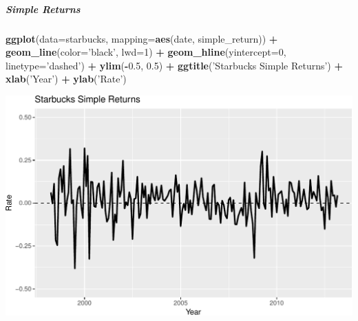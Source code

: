 \documentclass[]{article}
\newenvironment{Shaded}{\begin{snugshade}}{\end{snugshade}}
\newcommand{\KeywordTok}[1]{\textcolor[rgb]{0.13,0.29,0.53}{\textbf{#1}}}
\newcommand{\DataTypeTok}[1]{\textcolor[rgb]{0.13,0.29,0.53}{#1}}
\newcommand{\DecValTok}[1]{\textcolor[rgb]{0.00,0.00,0.81}{#1}}
\newcommand{\FloatTok}[1]{\textcolor[rgb]{0.00,0.00,0.81}{#1}}
\newcommand{\StringTok}[1]{\textcolor[rgb]{0.31,0.60,0.02}{#1}}
\newcommand{\OperatorTok}[1]{\textcolor[rgb]{0.81,0.36,0.00}{\textbf{#1}}}
\newcommand{\NormalTok}[1]{#1}
\let\oldsubparagraph\subparagraph
\renewcommand{\subparagraph}[1]{\oldsubparagraph{#1}\mbox{}}
\begin{document}
\begin{Shaded}
\end{Shaded}

\subparagraph{Simple Returns}\label{simple-returns}

\begin{Shaded}
\begin{Highlighting}[]
\KeywordTok{ggplot}\NormalTok{(}\DataTypeTok{data=}\NormalTok{starbucks, }\DataTypeTok{mapping=}\KeywordTok{aes}\NormalTok{(date, simple_return)) }\OperatorTok{+}
\StringTok{  }\KeywordTok{geom_line}\NormalTok{(}\DataTypeTok{color=}\StringTok{'black'}\NormalTok{, }\DataTypeTok{lwd=}\DecValTok{1}\NormalTok{) }\OperatorTok{+}
\StringTok{  }\KeywordTok{geom_hline}\NormalTok{(}\DataTypeTok{yintercept=}\DecValTok{0}\NormalTok{, }\DataTypeTok{linetype=}\StringTok{'dashed'}\NormalTok{) }\OperatorTok{+}
\StringTok{  }\KeywordTok{ylim}\NormalTok{(}\OperatorTok{-}\FloatTok{0.5}\NormalTok{, }\FloatTok{0.5}\NormalTok{) }\OperatorTok{+}
\StringTok{  }\KeywordTok{ggtitle}\NormalTok{(}\StringTok{'Starbucks Simple Returns'}\NormalTok{) }\OperatorTok{+}
\StringTok{  }\KeywordTok{xlab}\NormalTok{(}\StringTok{'Year'}\NormalTok{) }\OperatorTok{+}
\StringTok{  }\KeywordTok{ylab}\NormalTok{(}\StringTok{'Rate'}\NormalTok{)}
\end{Highlighting}
\end{Shaded}

\includegraphics{homework_1_markdown_files/figure-latex/unnamed-chunk-15-1.pdf}
\end{document}
